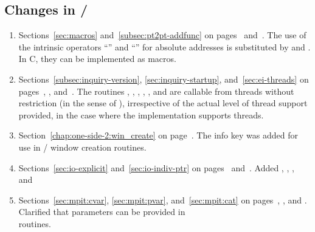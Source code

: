 \subsection{Changes in \texorpdfstring{\MPIIIIDOTI/}{MPI-3.1}}
\label{sec:changes-30-31}
 
\begin{enumerate}

\item 
Sections~\ref{sec:macros} and~\ref{subsec:pt2pt-addfunc} on pages~\pageref{sec:macros} and~\pageref{subsec:pt2pt-addfunc}.
\newline 
The use of the intrinsic operators ``\code{+}'' and ``\code{-}'' for absolute addresses is substituted by  and . In C, they can be implemented as macros. 

\item 
Sections~\ref{subsec:inquiry-version}, \ref{sec:inquiry-startup}, and~\ref{sec:ei-threads}
on pages~\pageref{subsec:inquiry-version}, \pageref{sec:inquiry-startup}, and~\pageref{sec:ei-threads}.
\newline 
The routines , ,
, , 
, and 
are callable from threads without restriction (in the sense of 
), irrespective of the actual level of thread support 
provided, in the case where the implementation supports threads.  

\item 
Section~\ref{chap:one-side-2:win_create} on page~\pageref{chap:one-side-2:win_create}.
\newline 
The  info key was added for use in \RMA/ window creation routines. 

\item 
Sections~\ref{sec:io-explicit} and~\ref{sec:io-indiv-ptr} 
on pages~\pageref{sec:io-explicit} and~\pageref{sec:io-indiv-ptr}.
\newline 
Added , ,
, and 

\item 
Sections~\ref{sec:mpit:cvar}, \ref{sec:mpit:pvar}, and~\ref{sec:mpit:cat}
on pages~\pageref{sec:mpit:cvar}, \pageref{sec:mpit:pvar}, and \pageref{sec:mpit:cat}.
\newline 
Clarified that  parameters can be provided
%
%
%
in\\
 routines. 


\end{enumerate}

